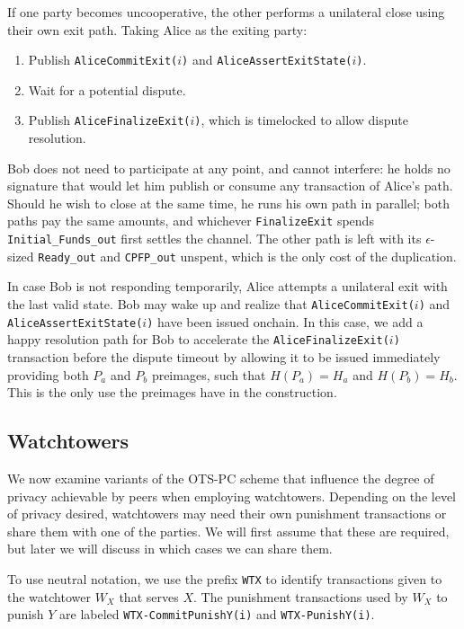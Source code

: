\documentclass[11pt,a4paper]{article}
\newcommand{\txname}[1]{\texttt{#1}}
\newcommand{\ioname}[1]{\texttt{#1}}
\begin{document}
If one party becomes uncooperative, the other performs a unilateral close using their own exit path. Taking Alice as the exiting party:

\begin{enumerate}
    \item Publish \txname{AliceCommitExit($i$)} and \txname{AliceAssertExitState($i$)}.
    \item Wait for a potential dispute.
    \item Publish \txname{AliceFinalizeExit($i$)}, which is timelocked to allow dispute resolution.
\end{enumerate}

Bob does not need to participate at any point, and cannot interfere: he holds no signature that would let him publish or consume any transaction of Alice's path. Should he wish to close at the same time, he runs his own path in parallel; both paths pay the same amounts, and whichever \txname{FinalizeExit} spends \ioname{Initial\_Funds\_out} first settles the channel. The other path is left with its $\epsilon$-sized \ioname{Ready\_out} and \ioname{CPFP\_out} unspent, which is the only cost of the duplication.

In case Bob is not responding temporarily, Alice attempts a unilateral exit with the last valid state. Bob may wake up and realize that \txname{AliceCommitExit($i$)} and \txname{AliceAssertExitState($i$)} have been issued onchain. In this case, we add a happy resolution path for Bob to accelerate the \txname{AliceFinalizeExit($i$)} transaction before the dispute timeout by allowing it to be issued immediately providing both $P_a$ and $P_b$ preimages, such that $H(P_a) = H_a$ and $H(P_b) = H_b$. This is the only use the preimages have in the construction.

\subsection{Watchtowers}
\label{watchtowers}

We now examine variants of the OTS-PC scheme that influence the degree of privacy achievable by peers when employing watchtowers. Depending on the level of privacy desired, watchtowers may need their own punishment transactions or share them with one of the parties. We will first assume that these are required, but later we will discuss in which cases we can share them.

To use neutral notation, we use the prefix \txname{WTX} to identify transactions given to the watchtower $W_X$ that serves $X$. The punishment transactions used by $W_X$ to punish $Y$ are labeled \txname{WTX-CommitPunishY(i)} and \txname{WTX-PunishY(i)}.
\end{document}
